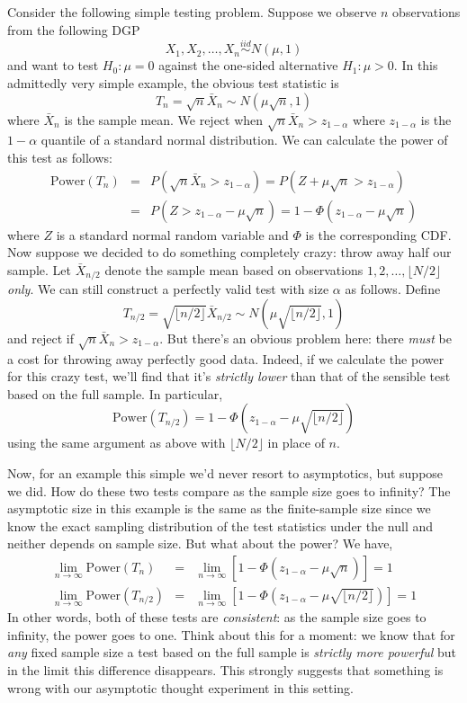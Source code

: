 \noindent Consider the following simple testing problem. Suppose we observe $n$ observations from the following DGP
$$X_1, X_2, \hdots, X_{n} \overset{iid}{\sim}N(\mu, 1)$$
and want to test $H_0\colon \mu = 0$ against the one-sided alternative $H_1\colon \mu >0$. 
In this admittedly very simple example, the obvious test statistic is
$$T_{n} = \sqrt{n} \bar{X}_{n} \sim N\left(\mu \sqrt{n}, 1\right)$$
where $\bar{X}_{n}$ is the sample mean. We reject when $\sqrt{n} \bar{X}_{n}>z_{1-\alpha}$ where $z_{1-\alpha}$ is the $1-\alpha$ quantile of a standard normal distribution. 
We can calculate the power of this test as follows:
\begin{eqnarray*}
\mbox{Power}(T_{n}) &=& P\left(\sqrt{n} \bar{X}_{n}>z_{1-\alpha}\right) = P\left(Z + \mu\sqrt{n} >z_{1-\alpha}\right)\\
&=&P\left(Z >z_{1-\alpha} - \mu\sqrt{n}\right) = 1 - \Phi\left(z_{1-\alpha} - \mu\sqrt{n}\right)
\end{eqnarray*}
where $Z$ is a standard normal random variable and $\Phi$ is the corresponding CDF. 
Now suppose we decided to do something completely crazy: throw away half our sample. Let $\bar{X}_{n/2}$ denote the sample mean based on observations $1, 2, \hdots, \lfloor N/2 \rfloor $ \emph{only}. 
We can still construct a perfectly valid test with size $\alpha$ as follows. 
Define
$$T_{n/2} = \sqrt{\lfloor n/2 \rfloor } \bar{X}_{n/2} \sim N\left(\mu \sqrt{\lfloor n/2 \rfloor }, 1\right)$$
and reject if $\sqrt{n} \bar{X}_n > z_{1-\alpha}$.
But there's an obvious problem here: there \emph{must} be a cost for throwing away perfectly good data. 
Indeed, if we calculate the power for this crazy test, we'll find that it's \emph{strictly lower} than that of the sensible test based on the full sample. 
In particular,
$$\mbox{Power}(T_{n/2}) = 1 - \Phi\left(z_{1-\alpha} - \mu\sqrt{\lfloor n/2 \rfloor }\right)$$
using the same argument as above with $\lfloor N/2 \rfloor $ in place of $n$.

Now, for an example this simple we'd never resort to asymptotics, but suppose we did. 
How do these two tests compare as the sample size goes to infinity? 
The asymptotic size in this example is the same as the finite-sample size since we know the exact sampling distribution of the test statistics under the null and neither depends on sample size. 
But what about the power? 
We have,
\begin{eqnarray*}
\lim_{n\rightarrow \infty} \mbox{Power}(T_{n}) &=& \lim_{n\rightarrow \infty}\left[1 - \Phi\left(z_{1-\alpha} - \mu\sqrt{n}\right) \right] = 1\\
\lim_{n\rightarrow \infty} \mbox{Power}(T_{n/2}) &=& \lim_{n\rightarrow \infty}\left[1 - \Phi\left(z_{1-\alpha} - \mu\sqrt{\lfloor n/2 \rfloor }\right) \right] = 1
\end{eqnarray*}
In other words, both of these tests are \emph{consistent}: as the sample size goes to infinity, the power goes to one. 
Think about this for a moment: we know that for \emph{any} fixed sample size a test based on the full sample is \emph{strictly more powerful} but in the limit this difference disappears. 
This strongly suggests that something is wrong with our asymptotic thought experiment in this setting.

